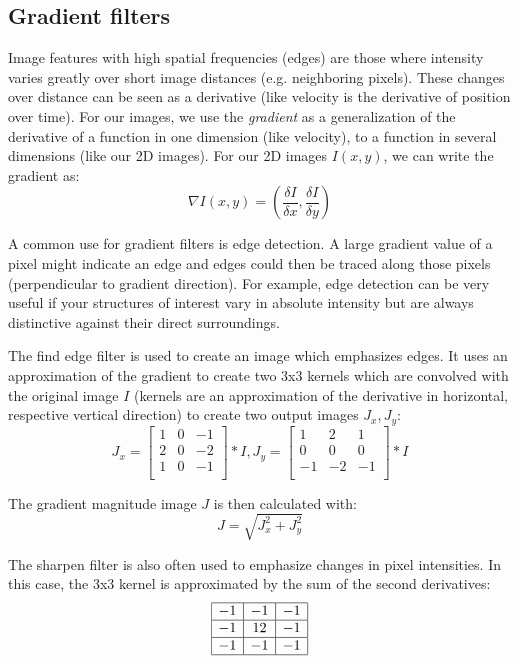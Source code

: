\subsection{Gradient filters}

Image features with high spatial frequencies (edges) are those where intensity varies greatly over short image distances (e.g. neighboring pixels). These changes over distance can be seen as a derivative (like velocity is the derivative of position over time). For our images, we use the \emph{gradient} as a generalization of the derivative of a function in one dimension (like velocity), to a function in several dimensions (like our 2D images). For our 2D images $I(x,y)$, we can write the gradient as:
\[
	\nabla I(x,y)=\left(\frac{\delta I}{\delta x},\frac{\delta I}{\delta y}\right)
\]

A common use for gradient filters is edge detection. A large gradient value of a pixel might indicate an edge and edges could then be traced along those pixels (perpendicular to gradient direction). For example, edge detection can be very useful if your structures of interest vary in absolute intensity but are always distinctive against their direct surroundings. 

The find edge filter is used to create an image which emphasizes edges. It uses an approximation of the gradient to create two 3x3 kernels which are convolved with the original image $I$ (kernels are an approximation of the derivative in horizontal, respective vertical direction) to create two output images $J_{x}, J_{y}$:
	\[
		J_{x}=\left[\begin{array}{ccc}
	1&0&-1\\
2&0&-2\\
1&0&-1\\
	\end{array}\right]\ast I, J_{y}=\left[\begin{array}{ccc}
	1&2&1\\
0&0&0\\
-1&-2&-1\\
	\end{array}\right]\ast I
\]

The gradient magnitude image $J$ is then calculated with:
\[
	J=\sqrt{J_{x}^{2}+J_{y}^{2}}
\]


The sharpen filter is also often used to emphasize changes in pixel intensities. In this case, the 3x3 kernel is approximated by the sum of the second derivatives:
	\[
		\begin{array}{|c|c|c|}
	\hline
	-1&-1&-1\\
\hline
-1&12&-1\\
\hline
-1&-1&-1\\
\hline
	\end{array}
\]

